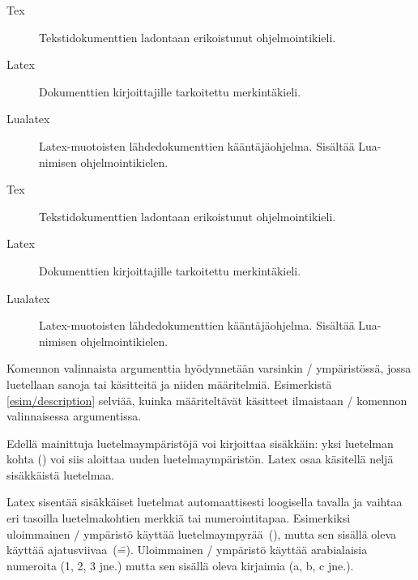 \begin{esimerkki*}

\begin{koodilohko}
\begin{description}
\item[Tex] Tekstidokumenttien ladontaan erikoistunut ohjelmointikieli.
\item[Latex] Dokumenttien kirjoittajille tarkoitettu merkintäkieli.
\item[Lualatex] Latex-muotoisten lähdedokumenttien kääntäjäohjelma.
  Sisältää Lua-nimisen ohjelmointikielen.
\end{description}
\end{koodilohko}

  \begin{tulos}
    \begin{description}
    \item[Tex] Tekstidokumenttien ladontaan erikoistunut ohjelmointikieli.
    \item[Latex] Dokumenttien kirjoittajille tarkoitettu merkintäkieli.
    \item[Lualatex] Latex-muotoisten lähdedokumenttien kääntäjäohjelma.
      Sisältää Lua-nimi\-sen ohjelmointikielen.
    \end{description}
  \end{tulos}
  \caption{Käsitteiden määritelmiä ja sen kaltaisia luetelmia voi
    toteuttaa \-/ ympäristön avulla. Käsitteet
    kirjoitetaan \-/ komennon valinnaiseen argumenttiin}
  \label{esim/description}
\end{esimerkki*}

\noindent
Komennon valinnaista argumenttia hyödynnetään varsinkin
\-/ ympäristössä, jossa luetellaan sanoja tai
käsitteitä ja niiden määritelmiä. Esimerkistä \ref{esim/description}
selviää, kuinka määriteltävät käsitteet ilmaistaan \-/
komennon valinnaisessa argumentissa.

Edellä mainittuja luetelmaympäristöjä voi kirjoittaa sisäkkäin: yksi
luetelman kohta () voi siis aloittaa uuden
luetelmaympäristön. Latex osaa käsitellä neljä sisäkkäistä luetelmaa.

Latex sisentää sisäkkäiset luetelmat automaattisesti loogisella tavalla
ja vaihtaa eri tasoilla luetelmakohtien merkkiä tai numerointitapaa.
Esimerkiksi uloimmainen \-/ ympäristö käyttää
luetelmaympyrää~(\textbullet), mutta sen sisällä oleva käyttää
ajatusviivaa~(\==). Uloimmainen \-/ ympäristö
käyttää arabialaisia numeroita (1, 2, 3 jne.) mutta sen sisällä oleva
kirjaimia (a, b, c jne.).


